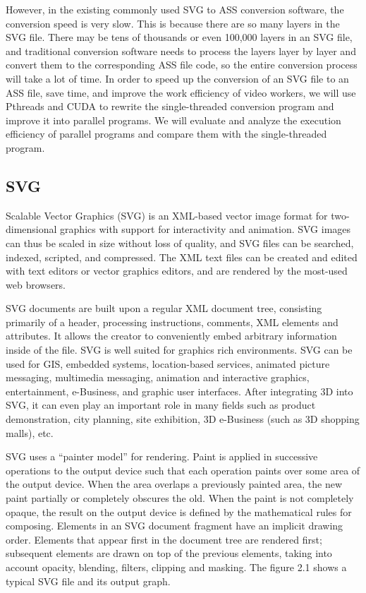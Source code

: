 \documentclass[10pt,twocolumn,letterpaper]{article}
\numberwithin{figure}{section}
\begin{document}
However, in the existing commonly used SVG to ASS conversion software, the conversion speed is very slow. This is because there are so many layers in the SVG file. There may be tens of thousands or even 100,000 layers in an SVG file, and traditional conversion software needs to process the layers layer by layer and convert them to the corresponding ASS file code, so the entire conversion process will take a lot of time. In order to speed up the conversion of an SVG file to an ASS file, save time, and improve the work efficiency of video workers, we will use Pthreads and CUDA to rewrite the single-threaded conversion program and improve it into parallel programs. We will evaluate and analyze the execution efficiency of parallel programs and compare them with the single-threaded program.

\subsection{SVG}

Scalable Vector Graphics (SVG) is an XML-based vector image format for two-dimensional graphics with support for interactivity and animation. SVG images can thus be scaled in size without loss of quality, and SVG files can be searched, indexed, scripted, and compressed. The XML text files can be created and edited with text editors or vector graphics editors, and are rendered by the most-used web browsers. 

SVG documents are built upon a regular XML document tree, consisting primarily of a header, processing instructions, comments, XML elements and attributes. It allows the creator to conveniently embed arbitrary information inside of the file. SVG is well suited for graphics rich environments. SVG can be used for GIS, embedded systems, location-based services, animated picture messaging, multimedia messaging, animation and interactive graphics, entertainment, e-Business, and graphic user interfaces. After integrating 3D into SVG, it can even play an important role in many fields such as product demonstration, city planning, site exhibition, 3D e-Business (such as 3D shopping malls), etc. 

SVG uses a “painter model” for rendering. Paint is applied in successive operations to the output device such that each operation paints over some area of the output device. When the area overlaps a previously painted area, the new paint partially or completely obscures the old. When the paint is not completely opaque, the result on the output device is defined by the mathematical rules for composing. Elements in an SVG document fragment have an implicit drawing order. Elements that appear first in the document tree are rendered first; subsequent elements are drawn on top of the previous elements, taking into account opacity, blending, filters, clipping and masking. 
The figure 2.1 shows a typical SVG file and its output graph.
\end{document}
